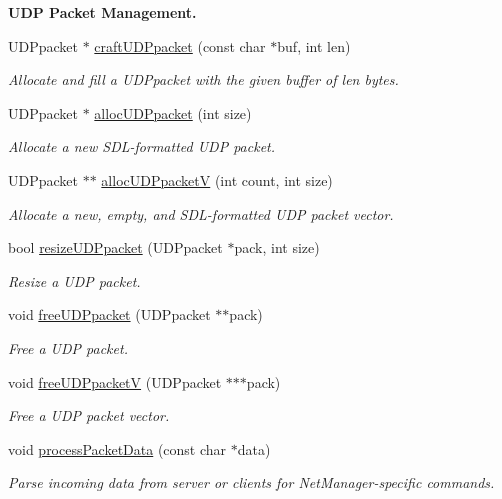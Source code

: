 \begin{Indent}{\bf U\-D\-P Packet Management.}\par
\begin{DoxyCompactItemize}
\item 
U\-D\-Ppacket $\ast$ \hyperlink{classNetManager_a5e53e36cb5fa09b218326c5a830269f4}{craft\-U\-D\-Ppacket} (const char $\ast$buf, int len)
\begin{DoxyCompactList}\small\item\em Allocate and fill a U\-D\-Ppacket with the given buffer of len bytes. \end{DoxyCompactList}\item 
U\-D\-Ppacket $\ast$ \hyperlink{classNetManager_a75ce7beb5894c63e3af5e59c4fe67483}{alloc\-U\-D\-Ppacket} (int size)
\begin{DoxyCompactList}\small\item\em Allocate a new S\-D\-L-\/formatted U\-D\-P packet. \end{DoxyCompactList}\item 
U\-D\-Ppacket $\ast$$\ast$ \hyperlink{classNetManager_a21e6fdda58659998dbb2e0959efefff5}{alloc\-U\-D\-Ppacket\-V} (int count, int size)
\begin{DoxyCompactList}\small\item\em Allocate a new, empty, and S\-D\-L-\/formatted U\-D\-P packet vector. \end{DoxyCompactList}\item 
bool \hyperlink{classNetManager_ae9daa22fe531b7204b004d8136d00e0e}{resize\-U\-D\-Ppacket} (U\-D\-Ppacket $\ast$pack, int size)
\begin{DoxyCompactList}\small\item\em Resize a U\-D\-P packet. \end{DoxyCompactList}\item 
void \hyperlink{classNetManager_af3cc0529a2c40d959bdb624e9f3101c4}{free\-U\-D\-Ppacket} (U\-D\-Ppacket $\ast$$\ast$pack)
\begin{DoxyCompactList}\small\item\em Free a U\-D\-P packet. \end{DoxyCompactList}\item 
void \hyperlink{classNetManager_a4c118ed195c8c3608b2758d6dd5da7ae}{free\-U\-D\-Ppacket\-V} (U\-D\-Ppacket $\ast$$\ast$$\ast$pack)
\begin{DoxyCompactList}\small\item\em Free a U\-D\-P packet vector. \end{DoxyCompactList}\item 
void \hyperlink{classNetManager_a5927d55003a434ec69d8909dffe88575}{process\-Packet\-Data} (const char $\ast$data)
\begin{DoxyCompactList}\small\item\em Parse incoming data from server or clients for Net\-Manager-\/specific commands. \end{DoxyCompactList}\end{DoxyCompactItemize}
\end{Indent}
